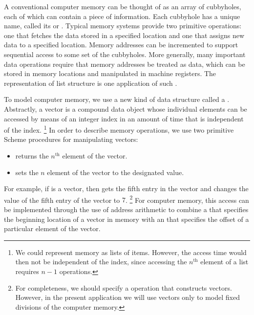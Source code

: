 A conventional computer memory can be thought of as an array of cubbyholes, each of which can contain a piece of information.
Each cubbyhole has a unique name, called its  or .
Typical memory systems provide two primitive operations:
one that fetches the data stored in a specified location and one that assigns new data to a specified location.
Memory addresses can be incremented to support sequential access to some set of the cubbyholes.
More generally, many important data operations require that memory addresses be treated as data, which can be stored in memory locations and manipulated in machine registers.
The representation of list structure is one application of such .

To model computer memory, we use a new kind of data structure called a .
Abstractly, a vector is a compound data object whose individual elements can be accessed by means of an integer index in an amount of time that is independent of the index.%
\footnote{
	We could represent memory as lists of items.
	However, the access time would then not be independent of the index, since accessing the \( n^{\mathrm{th}} \) element of a list requires \( n - 1 \)  operations.
}
In order to describe memory operations, we use two primitive Scheme procedures for manipulating vectors:
\begin{itemize}

	\item
		 returns the \( n^{\mathrm{th}} \) element of the vector.

	\item
		 sets the \( n \) element of the vector to the designated value.

\end{itemize}
For example, if  is a vector, then  gets the fifth entry in the vector  and  changes the value of the fifth entry of the vector  to \( 7 \).%
\footnote{
	For completeness, we should specify a  operation that constructs vectors.
	However, in the present application we will use vectors only to model fixed divisions of the computer memory.
}
For computer memory, this access can be implemented through the use of address arithmetic to combine a  that specifies the beginning location of a vector in memory with an  that specifies the offset of a particular element of the vector.



